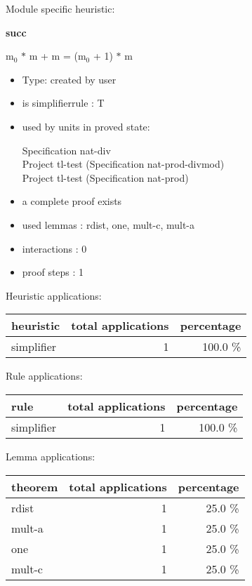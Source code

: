 \documentclass[a4paper]{article}
\begin{document}
Module specific heuristic:

\pagebreak

{\LARGE\bf succ}\label{lemma-succ}

\medskip

 \Fol $\mbox{m}_{0}$ $*$ m + m = ($\mbox{m}_{0}$ + 1) $*$ m

\begin{itemize}

\item Type: created by user

\item is simplifierrule : T
\item used by units in proved state:

Specification nat-div \\
Project tl-test (Specification nat-prod-divmod) \\
Project tl-test (Specification nat-prod)
\item       a complete proof exists
\item       used lemmas  : rdist, one, mult-c, mult-a
\item       interactions : 0
\item       proof steps  : 1
\end{itemize}

\medskip


Heuristic applications:

\begin{supertabular}{l|r|r}
heuristic	& total applications & percentage \\ \hline
simplifier & 1 & 100.0 \% \\

\end{supertabular}

Rule applications:

\begin{supertabular}{l|r|r}
rule	        & total applications & percentage \\ \hline
simplifier & 1 & 100.0 \% \\

\end{supertabular}

Lemma applications:

\begin{supertabular}{l|r|r}
theorem	        & total applications & percentage \\ \hline
rdist & 1 & 25.0 \% \\
mult-a & 1 & 25.0 \% \\
one & 1 & 25.0 \% \\
mult-c & 1 & 25.0 \% \\

\end{supertabular}
\end{document}
